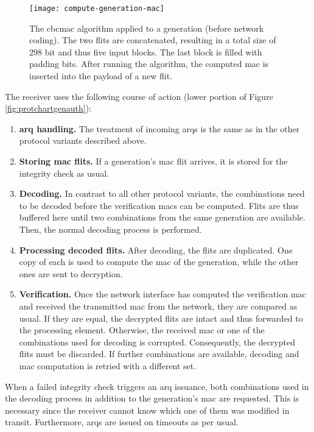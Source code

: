 \begin{figure}
    \centering
    \texttt{[image: compute-generation-mac]}
    \caption[CBC-MAC algorithm applied to a generation]{The \gls{cbcmac} algorithm applied to a generation (before network coding). The two flits are
    concatenated, resulting in a total size of 298 bit and thus five input blocks. The last block is filled with padding bits. After running the
    algorithm, the computed \gls{mac} is inserted into the payload of a new flit.}
    \label{fig:computegenerationmac}
\end{figure}

The receiver uses the following course of action (lower portion of Figure \ref{fig:protchartgenauth}):
\begin{enumerate}
    \item \textbf{\Gls{arq} handling.} The treatment of incoming \glspl{arq} is the same as in the other protocol variants described above.
    \item \textbf{Storing \gls{mac} flits.} If a generation's \gls{mac} flit arrives, it is stored for the integrity check as usual.
    \item \textbf{Decoding.} In contrast to all other protocol variants, the combinations need to be decoded before the verification \glspl{mac} can
        be computed. Flits are thus buffered here until two combinations from the same generation are available. Then, the normal decoding process is
        performed.
    \item \textbf{Processing decoded flits.} After decoding, the flits are duplicated. One copy of each is used to compute the \gls{mac} of the
        generation, while the other ones are sent to decryption.
    \item \textbf{Verification.} Once the network interface has computed the verification \gls{mac} and received the transmitted \gls{mac} from the
        network, they are compared as usual. If they are equal, the decrypted flits are intact and thus forwarded to the processing element.
        Otherwise, the received \gls{mac} or one of the combinations used for decoding is corrupted. Consequently, the decrypted flits must be
        discarded. If further combinations are available, decoding and \gls{mac} computation is retried with a different set.
\end{enumerate}
\vspace{0.5\baselineskip}

When a failed integrity check triggers an \gls{arq} issuance, both combinations used in the decoding process in addition to the generation's
\gls{mac} are requested. This is necessary since the receiver cannot know which one of them was modified in transit. Furthermore, \glspl{arq} are
issued on timeouts as per usual.

